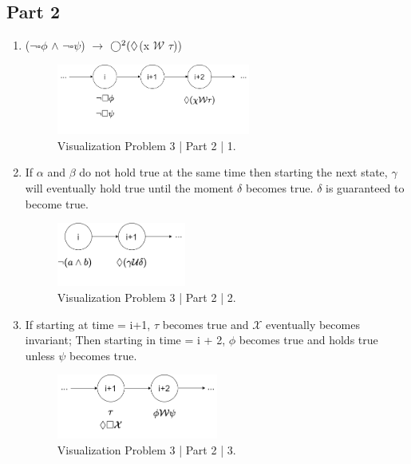 \documentclass[12pt]{article}
\begin{document}
\subsection*{Part 2}
\begin{enumerate}
	
	\item
	 ($\neg\square\phi$ $\wedge$ $\neg\square\psi$) $\rightarrow$ $\bigcirc\textsuperscript{2}(\lozenge$(x $\mathcal{W}$ $\tau$))
	
	\begin{figure}[htbp]
		\centering
		\includegraphics[width=0.60\textwidth]{SOEN331_A1_P321.PNG}
		\caption{Visualization Problem 3 | Part 2 | 1.}
	\end{figure}
	\item If $\alpha$ and $\beta$ do not hold true at the same time then starting the next state, $\gamma$ will eventually hold true until the moment $\delta$ becomes true. $\delta$ is guaranteed to become true.
	\begin{figure}[htbp]
		\centering
		\includegraphics[width=0.40\textwidth]{SOEN331_A1_P322(visual-formula).PNG}
		\caption{Visualization Problem 3 | Part 2 | 2.}
	\end{figure}
	\item If starting at time = i+1, $\tau$ becomes true and $\mathcal{X}$ eventually becomes invariant; Then starting in time = i + 2, $\phi$ becomes true and holds true unless $\psi$ becomes true.
	\begin{figure}[htbp]
		\centering
		\includegraphics[width=0.50\textwidth]{SOEN331_A1_P323(visual-formula).PNG}
		\caption{Visualization Problem 3 | Part 2 | 3.}
	\end{figure}
\end{enumerate}
\newpage
\end{document}
